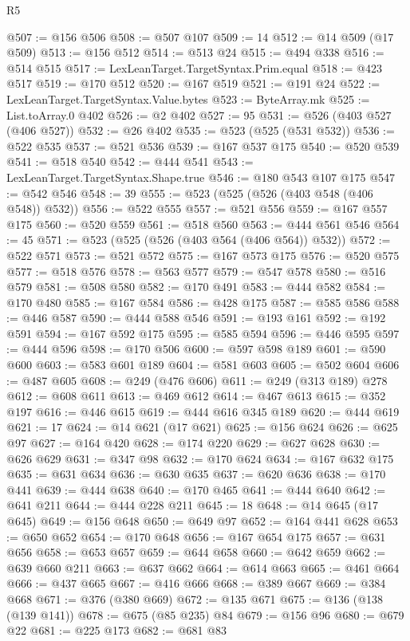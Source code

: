 \begin{lexlean}{R5}
\begin{coremodule}
@507 := @156 @506
@508 := @507 @107
@509 := 14
@512 := @14 @509 (@17 @509)
@513 := @156 @512
@514 := @513 @24
@515 := @494 @338
@516 := @514 @515
@517 := LexLeanTarget.TargetSyntax.Prim.equal
@518 := @423 @517
@519 := @170 @512
@520 := @167 @519
@521 := @191 @24
@522 := LexLeanTarget.TargetSyntax.Value.bytes
@523 := ByteArray.mk
@525 := List.toArray.{0} @402
@526 := @2 @402
@527 := 95
@531 := @526 (@403 @527 (@406 @527))
@532 := @26 @402
@535 := @523 (@525 (@531 @532))
@536 := @522 @535
@537 := @521 @536
@539 := @167 @537 @175
@540 := @520 @539
@541 := @518 @540
@542 := @444 @541
@543 := LexLeanTarget.TargetSyntax.Shape.true
@546 := @180 @543 @107 @175
@547 := @542 @546
@548 := 39
@555 := @523 (@525 (@526 (@403 @548 (@406 @548)) @532))
@556 := @522 @555
@557 := @521 @556
@559 := @167 @557 @175
@560 := @520 @559
@561 := @518 @560
@563 := @444 @561 @546
@564 := 45
@571 := @523 (@525 (@526 (@403 @564 (@406 @564)) @532))
@572 := @522 @571
@573 := @521 @572
@575 := @167 @573 @175
@576 := @520 @575
@577 := @518 @576
@578 := @563 @577
@579 := @547 @578
@580 := @516 @579
@581 := @508 @580
@582 := @170 @491
@583 := @444 @582
@584 := @170 @480
@585 := @167 @584
@586 := @428 @175
@587 := @585 @586
@588 := @446 @587
@590 := @444 @588 @546
@591 := @193 @161
@592 := @192 @591
@594 := @167 @592 @175
@595 := @585 @594
@596 := @446 @595
@597 := @444 @596
@598 := @170 @506
@600 := @597 @598 @189
@601 := @590 @600
@603 := @583 @601 @189
@604 := @581 @603
@605 := @502 @604
@606 := @487 @605
@608 := @249 (@476 @606)
@611 := @249 (@313 @189) @278
@612 := @608 @611
@613 := @469 @612
@614 := @467 @613
@615 := @352 @197
@616 := @446 @615
@619 := @444 @616 @345 @189
@620 := @444 @619
@621 := 17
@624 := @14 @621 (@17 @621)
@625 := @156 @624
@626 := @625 @97
@627 := @164 @420
@628 := @174 @220
@629 := @627 @628
@630 := @626 @629
@631 := @347 @98
@632 := @170 @624
@634 := @167 @632 @175
@635 := @631 @634
@636 := @630 @635
@637 := @620 @636
@638 := @170 @441
@639 := @444 @638
@640 := @170 @465
@641 := @444 @640
@642 := @641 @211
@644 := @444 @228 @211
@645 := 18
@648 := @14 @645 (@17 @645)
@649 := @156 @648
@650 := @649 @97
@652 := @164 @441 @628
@653 := @650 @652
@654 := @170 @648
@656 := @167 @654 @175
@657 := @631 @656
@658 := @653 @657
@659 := @644 @658
@660 := @642 @659
@662 := @639 @660 @211
@663 := @637 @662
@664 := @614 @663
@665 := @461 @664
@666 := @437 @665
@667 := @416 @666
@668 := @389 @667
@669 := @384 @668
@671 := @376 (@380 @669)
@672 := @135 @671
@675 := @136 (@138 (@139 @141))
@678 := @675 (@85 @235) @84
@679 := @156 @96
@680 := @679 @22
@681 := @225 @173
@682 := @681 @83

\end{coremodule}
\end{lexlean}
